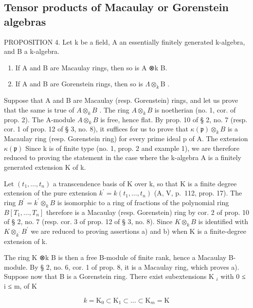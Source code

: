 \subsection{Tensor products of Macaulay or Gorenstein algebras}

PROPOSITION 4. Let k be a field, A an essentially finitely generated k-algebra, and B a k-algebra.

\begin{enumerate}
\def\labelenumi{\alph{enumi})}
\item
  If A and B are Macaulay rings, then so is A ⊗k B.
\item
  If A and B are Gorenstein rings, then so is \(\Lambda\otimes_{k}\mathrm{B}\) .
\end{enumerate}

Suppose that A and B are Macaulay (resp. Gorenstein) rings, and let us prove that the same is true of \(A \otimes_{k} B\) . The ring \(A \otimes_{k} B\) is noetherian (no. 1, cor. of prop. 2). The A-module \(A \otimes_{k} B\) is free, hence flat. By prop. 10 of § 2, no. 7 (resp. cor. 1 of prop. 12 of § 3, no. 8), it suffices for us to prove that \(\kappa(\mathfrak{p}) \otimes_{k} B\) is a Macaulay ring (resp. Gorenstein ring) for every prime ideal p of A. The extension \(\kappa(\mathfrak{p})\) Since k is of finite type (no. 1, prop. 2 and example 1), we are therefore reduced to proving the statement in the case where the k-algebra A is a finitely generated extension K of k.

Let \((t_{1},\ldots,t_{n})\) a transcendence basis of K over k, so that K is a finite degree extension of the pure extension \(k^{\prime}=k(t_{1},\ldots,t_{n})\) (A, V, p.~112, prop. 17). The ring \(B^{\prime}=k^{\prime}\otimes_{k}B\) is isomorphic to a ring of fractions of the polynomial ring \(B[T_{1},\ldots,T_{n}]\) therefore is a Macaulay (resp. Gorenstein) ring by cor. 2 of prop. 10 of § 2, no. 7 (resp. cor. 3 of prop. 12 of § 3, no. 8). Since \(K\otimes_{k}B\) is identified with \(K\otimes_{k^{\prime}}B^{\prime}\) we are reduced to proving assertions a) and b) when K is a finite-degree extension of k.

The ring K ⊗k B is then a free B-module of finite rank, hence a Macaulay B-module. By § 2, no. 6, cor. 1 of prop. 8, it is a Macaulay ring, which proves a). Suppose now that B is a Gorenstein ring. There exist subextensions K \(_{i}\) with 0 ≤ i ≤ m, of K

\[
k = \mathrm{K} _ {0} \subset \mathrm{K} _ {1} \subset \dots \subset \mathrm{K} _ {m} = \mathrm{K}
\]

